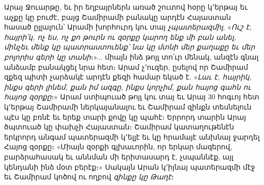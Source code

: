 \documentclass{article}
\begin{document}
{Արայ Ջուարթը, եւ իր եղբայրներն առած շուտով հօրը կ՚երթայ եւ աչքը կը բուժէ, բայց Շամիրամի բանակը արդէն Հայաստան հասած ըլլալուն՝ Արամի խորհուրդ կու տայ \emph{չպատերազմիլ}. «\emph{Ուշ է, հայրի՛կ, ոչ ես, ոչ քո թուրն ու զօրքը կարող ենք մի բան անել, մինչեւ մենք կը պատրաստուենք՝ նա կը մտնի մեր քաղաքը եւ մեր բոլորիս գերի կը տանի}։»... միայն ինձ թոյլ տո՛ւր մենակ, անզէն գնալ անձամբ բանակցել նրա հետ։ Արամ չ՚ուզեր, ըսելով որ Շամիրամ զքեզ պիտի չարձակէ արդէն քեզի համար եկած է. «\emph{Լաւ է, հայրիկ, ինքս գերի լինեմ, քան իմ ազգը, ինքս կորչիմ, քան հայոց գահն ու հայոց զօրքը}։» Արամ ստիպուած թոյլ կու տայ եւ Արայ 30 հոգւոյ հետ կ՚երթայ Շամիրամի ներկայանալու եւ Շամիրամ զինքն տեսնելուն պէս կը բռնէ եւ երեք տարի քովը կը պահէ։ Երրորդ տարին Արայ ծպտուած կը փախչի Հայաստան։ Շամիրամ կատաղութենէն երկրորդ անգամ պատերազմի կ՚ելլէ եւ կը հրամայէ անխնայ ջարդել Հայոց զօրքը։ «Միայն զօրքի գլխաւորին, որ երկար մազերով, բարձրահասակ եւ աննման մի երիտասարդ է, չսպաննէք, այլ կենդանի ինձ մօտ բերէք։» Սակայն Արան կ՚իյնայ պատերազմի մէջ եւ Շամիրամ կոծով ու ողբով \emph{զինքը կը Թաղէ}։

}
\end{document}
